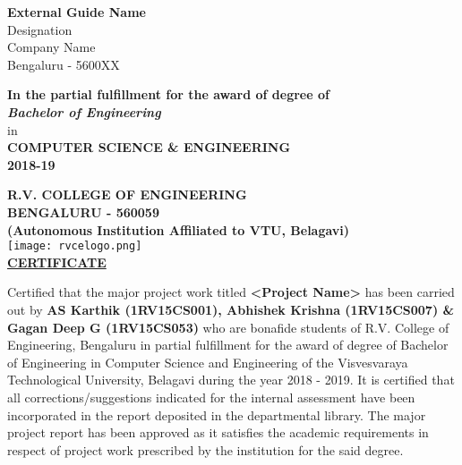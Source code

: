 \begin{center}
\begin{multicols}{2}
		\columnbreak

		\normalsize \textbf{External Guide Name}\\
		\normalsize Designation\\
		\normalsize Company Name\\
		\normalsize Bengaluru - 5600XX\\

	\end{multicols}

	\bigskip
	\medskip

	\normalsize \textbf {In the partial fulfillment for the award of degree of}\\
	\normalsize \textbf {\textit{Bachelor of Engineering}}\\ in \\
	\normalsize \textbf {COMPUTER SCIENCE \& ENGINEERING \\ 2018-19}

\end{center}



\newpage


\begin{center}
	\textbf {
		\Large R.V. COLLEGE OF ENGINEERING\\
		\Large BENGALURU - 560059\\
		\small(Autonomous Institution Affiliated to VTU, Belagavi)\\[0.3cm]
	}
	\texttt{[image: rvcelogo.png]}\\[0.3cm]
		\Large \textbf{\underline {CERTIFICATE}}\\
\end{center}
\linespread{1.2}\normalsize \begin{center} \justify
Certified that the major project work titled \textbf{<Project Name>} has been carried out by \textbf{AS Karthik (1RV15CS001), Abhishek Krishna (1RV15CS007) \& Gagan Deep G (1RV15CS053)} who are bonafide students of R.V. College of Engineering, Bengaluru in partial fulfillment for the award of degree of Bachelor of Engineering in Computer Science and Engineering of the Visvesvaraya Technological University, Belagavi during the year 2018 - 2019. It is certified that all corrections/suggestions indicated for the internal assessment have been incorporated in the report deposited in the departmental library. The major project report has been approved as it satisfies the academic requirements in respect of project work prescribed by the institution for the said degree.
\end{center}

